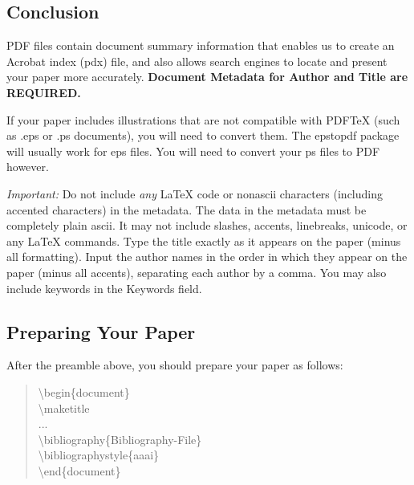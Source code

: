 \documentclass[letterpaper]{article}
\begin{document}
	\subsection{Conclusion}
	PDF files contain document summary information that enables us to create an Acrobat index (pdx) file, and also allows search engines to locate and present your paper more accurately. \textbf{Document Metadata  for Author and Title are REQUIRED.} 
	
	If your paper includes illustrations that are not compatible with PDF\TeX{} (such as .eps or .ps documents), you will need to convert them. The epstopdf package will usually work for eps files. You will need to convert your ps files to PDF however.
	
	\textit{Important:} Do not include \textit{any} \LaTeX{} code or nonascii characters (including accented characters) in the metadata. The data in the metadata must be completely plain ascii. It may not include slashes, accents, linebreaks, unicode, or any \LaTeX{} commands. Type the title exactly as it appears on the paper (minus all formatting). Input the author names in the order in which they appear on the paper (minus all accents), separating each author by a comma. You may also include keywords in the Keywords field.
	
	
	
	\subsection{Preparing Your Paper}
	
	After the preamble above, you should prepare your paper as follows:
	
	\begin{quote}
		\begin{small}
			\textbackslash begin\{document\}\\
			\textbackslash maketitle\\
			...\\
			\textbackslash bibliography\{Bibliography-File\}\\
			\textbackslash bibliographystyle\{aaai\}\\
			\textbackslash end\{document\}\\
		\end{small}
	\end{quote}
\end{document}
